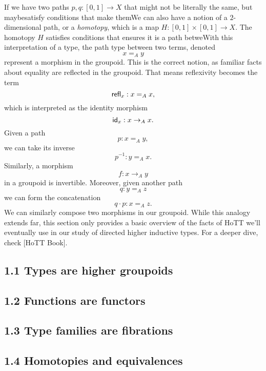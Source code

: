 \documentclass{article}
\theoremstyle{named}
\theoremstyle{remark}
\theoremstyle{definition}
\begin{document}
If we have two paths $p,q : [0,1] \to X$ that might not be literally the same, but maybesatisfy conditions that make themWe can also have a notion of a $2$-dimensional path, or a \textit{homotopy}, which is a map $H : [0,1] \times [0,1] \to X$. The homotopy $H$ satisfies conditions that ensures it is a path betweWith this interpretation of a type, the path type between two terms, denoted $$x =_A y$$ represent a morphism in the groupoid. This is the correct notion, as familiar facts about equality are
reflected in the groupoid. That means reflexivity becomes the term $$\mathsf{refl}_{x} : x=_A x,$$ which is interpreted as the identity morphism $$\mathsf{id}_{x} : x \to_A x.$$ Given a path $$p : x =_A y,$$ we can take its inverse $$p^{-1} : y =_A x.$$ Similarly, a morphism $$f : x \to_A y$$ in a groupoid is invertible. Moreover, given another path $$q : y =_A z$$ we can form the concatenation $$q \cdot p : x =_A z.$$ We can similarly compose two morphisms in our groupoid. While this analogy extends far, this section only provides a basic overview of the facts of HoTT we'll eventually use in our study of directed higher inductive types. For a deeper dive, check [HoTT Book]. 

\setcounter{section}{1}

\subsection*{1.1 Types are higher groupoids}


\subsection*{1.2 Functions are functors}


\subsection*{1.3 Type families are fibrations}




\subsection*{1.4 Homotopies and equivalences}

\end{document}
